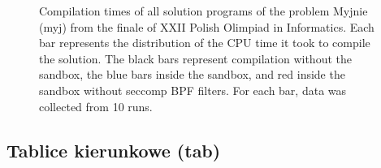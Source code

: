 \documentclass[en]{pracamgr}
\begin{document}
\begin{appendices}
\begin{figure}[H]
\caption{Compilation times of all solution programs of the problem Myjnie (myj) from the finale of XXII Polish Olimpiad in Informatics. Each bar represents the distribution of the CPU time it took to compile the solution. The black bars represent compilation without the sandbox, the blue bars inside the sandbox, and red inside the sandbox without seccomp BPF filters. For each bar, data was collected from 10 runs.}
\label{figure:myj_compilation_cpu_time}
\end{figure}

\subsection{Tablice kierunkowe (tab)}


\end{appendices}
\end{document}
